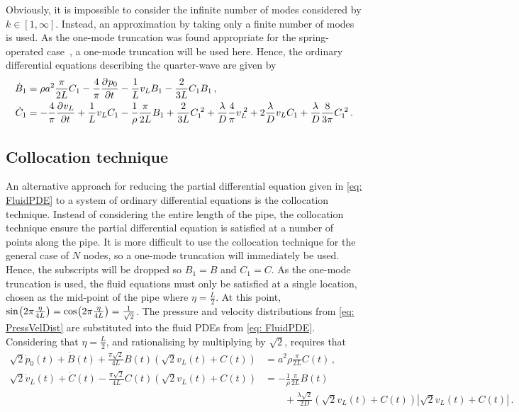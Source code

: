 Obviously, it is impossible to consider the infinite number of modes considered by $k \in [1,\infty]$. Instead, an approximation by taking only a finite number of modes is used. As the one-mode truncation was found appropriate for the spring-operated case~\cite{Hos2015ModelPipe}, a one-mode truncation will be used here. Hence, the ordinary differential equations describing the quarter-wave are given by
~
\begin{equation*}
\begin{split}
    \dot{B}_1 &= \rho a^2 \frac{\pi}{2 L} C_1 - \frac{4}{\pi} \pdiff{p_0}{t} - \frac{1}{L} v_L B_1 - \frac{2}{3L} C_1 B_1 \, ,
    \\
    \dot{C}_1 &= - \frac{4}{\pi} \pdiff{v_L}{t} + \frac{1}{L} v_L C_1 - \frac{1}{\rho} \frac{\pi}{2L} B_1 + \frac{2}{3L} C_1\power{2} + \frac{\lambda}{D} \frac{4}{\pi} v_L\power{2} + 2 \frac{\lambda}{D} v_L C_1 + \frac{\lambda}{D} \frac{8}{3 \pi} C_1\power{2} \, .
\end{split}
\end{equation*}

\subsection{Collocation technique}

An alternative approach for reducing the partial differential equation given in \cref{eq: FluidPDE} to a system of ordinary differential equations is the collocation technique. Instead of considering the entire length of the pipe, the collocation technique ensure the partial differential equation is satisfied at a number of points along the pipe. It is more difficult to use the collocation technique for the general case of $N$ nodes, so a one-mode truncation will immediately be used. Hence, the subscripts will be dropped so $B_1 = B$ and $C_1 = C$. As the one-mode truncation is used, the fluid equations must only be satisfied at a single location, chosen as the mid-point of the pipe where $\eta = \frac{L}{2}$.
%
At this point, $\fun{sin}{2 \pi \frac{\eta}{4L}} = \fun{cos}{2 \pi \frac{\eta}{4L}} = \frac{1}{\sqrt{2}}$.
%
The pressure and velocity distributions from \cref{eq: PressVelDist} are substituted into the fluid PDEs from \cref{eq: FluidPDE}. Considering that $\eta = \frac{L}{2}$, and rationalising by multiplying by $\sqrt{2}$, requires that
~
\begin{equation} \label{eq: CollocationODE}
\begin{split}
    \sqrt{2} \dot{p}_0(t) + \dot{B}(t) + \frac{\pi \sqrt{2}}{4 L} B(t) \left( \sqrt{2} v_L(t) + C(t) \right) &= a^2 \rho \frac{\pi}{2L} C(t) \, , \\
    \sqrt{2} \dot{v}_L(t) + \dot{C}(t) - \frac{\pi \sqrt{2}}{4 L} C(t) \left( \sqrt{2} v_L(t) + C(t) \right) &= - \frac{1}{\rho} \frac{\pi}{2 L} B(t) \\
    &\qquad + \frac{\lambda \sqrt{2}}{2D} \left( \sqrt{2} v_L(t) + C(t) \right) \left| \sqrt{2} v_L(t) + C(t) \right| \, .
\end{split}
\end{equation}


